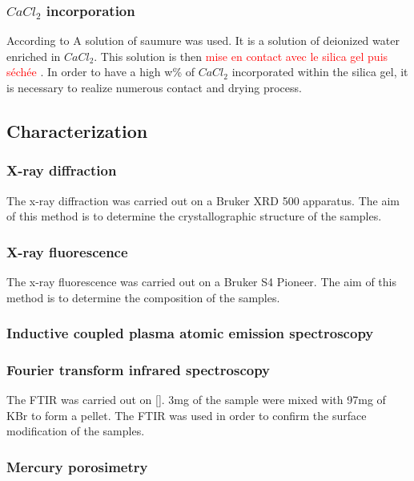 \documentclass[12pt,a4paper]{article}
\begin{document}


\subsubsection*{\textbf{$CaCl_2$} incorporation}

\cite{Courbon}
According to 
A solution of saumure was used. It is a solution of deionized water enriched in $CaCl_2$. This solution is then \textcolor{red}{mise en contact avec le silica gel puis séchée \cite{pda}}. In order to have a high w\% of $CaCl_2$ incorporated within the silica gel, it is necessary to realize numerous contact and drying process.
\subsection{Characterization}
\subsubsection*{X-ray diffraction}
The x-ray diffraction was carried out on a Bruker XRD 500 apparatus. The aim of this method is to determine the crystallographic structure of the samples.
\subsubsection*{X-ray fluorescence}
The x-ray fluorescence was carried out on a Bruker S4 Pioneer. The aim of this method is to determine the composition of the samples.
\subsubsection*{Inductive coupled plasma atomic emission spectroscopy}

\subsubsection*{Fourier transform infrared spectroscopy}
The FTIR was carried out on []. 3mg of the sample were mixed with 97mg of KBr to form a pellet. The FTIR was used in order to confirm the surface modification of the samples.
\subsubsection*{Mercury porosimetry}
\end{document}
